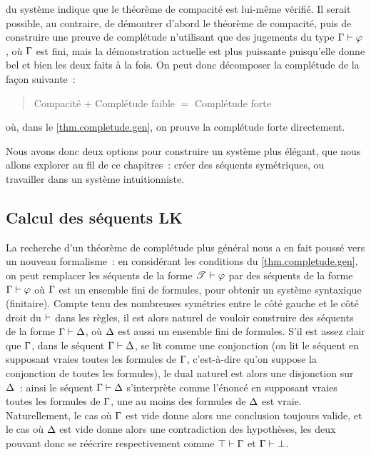 \begin{itemize}
  du système indique que le théorème de compacité est lui-même vérifié. Il
  serait possible, au contraire, de démontrer d'abord le théorème de compacité,
  puis de construire une preuve de complétude n'utilisant que des jugements du
  type $\Gamma\vdash \varphi$, où $\Gamma$ est fini, mais la démonstration actuelle
  est plus puissante puisqu'elle donne bel et bien les deux faits à la fois. On
  peut donc décomposer la complétude de la façon suivante~:
  \begin{quotation}
    \noindent
    Compacité $+$ Complétude faible $=$ Complétude forte
  \end{quotation}
  où, dans le \cref{thm.completude.gen}, on prouve la complétude forte
  directement.
\end{itemize}

Nous avons donc deux options pour construire un système plus \og élégant\fg, que
nous allons explorer au fil de ce chapitres~: créer des séquents symétriques, ou
travailler dans un système intuitionniste.

\subsection{Calcul des séquents LK}

La recherche d'un théorème de complétude plus général nous a en fait poussé vers
un nouveau formalisme~: en considérant les conditions du
\cref{thm.completude.gen}, on peut remplacer les séquents de la forme
$\mathscr T \vdash \varphi$ par des séquents de la forme $\Gamma \vdash \varphi$ où
$\Gamma$ est un ensemble fini de formules, pour obtenir un système syntaxique
(finitaire). Compte tenu des nombreuses symétries entre le côté gauche et le
côté droit du $\vdash$ dans les règles, il est alors naturel de vouloir construire
des séquents de la forme $\Gamma\vdash \Delta$, où $\Delta$ est aussi un ensemble
fini de formules. S'il est assez clair que $\Gamma$, dans le séquent
$\Gamma\vdash \Delta$, se lit comme une conjonction (on lit le séquent \og en
supposant vraies toutes les formules de $\Gamma$\fg, c'est-à-dire qu'on suppose
la conjonction de toutes les formules), le dual naturel est alors une
disjonction sur $\Delta$~: ainsi le séquent $\Gamma\vdash \Delta$ s'interprète
comme l'énoncé \og en supposant vraies toutes les formules de $\Gamma$, une au
moins des formules de $\Delta$ est vraie\fg. Naturellement, le cas où $\Gamma$
est vide donne alors une conclusion toujours valide, et le cas où $\Delta$ est
vide donne alors une contradiction des hypothèses, les deux pouvant donc se
réécrire respectivement comme $\top \vdash \Gamma$ et $\Gamma\vdash \bot$.

